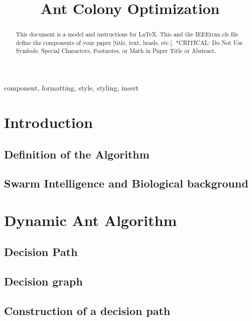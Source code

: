 \documentclass[conference]{IEEEtran}
\begin{document}
\title{Ant Colony Optimization}

\author{
}
\maketitle

\begin{abstract}
This document is a model and instructions for \LaTeX.
This and the IEEEtran.cls file define the components of your paper [title, text, heads, etc.]. *CRITICAL: Do Not Use Symbols, Special Characters, Footnotes, 
or Math in Paper Title or Abstract.
\end{abstract}

\begin{IEEEkeywords}
component, formatting, style, styling, insert
\end{IEEEkeywords}

\section{Introduction}
\subsection{Definition of the Algorithm}
\subsection{Swarm Intelligence and Biological background}
\section{Dynamic Ant Algorithm}
\subsection{Decision Path}
\subsection{Decision graph}
\subsection{Construction of a decision path}
\end{document}
